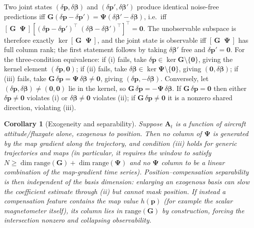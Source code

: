 \documentclass{IEEEtaes}
\newtheorem{corollary}{Corollary}
\begin{document}
\begin{IEEEproof}
Two joint states $(\delta\mathbf{p},\delta\boldsymbol{\beta})$ and
$(\delta\mathbf{p}',\delta\boldsymbol{\beta}')$ produce identical noise-free
predictions iff
$\mathbf{G}(\delta\mathbf{p}-\delta\mathbf{p}')=\boldsymbol{\Psi}(\delta\boldsymbol{\beta}'-\delta\boldsymbol{\beta})$,
i.e.\ iff
$[\,\mathbf{G}\;\;\boldsymbol{\Psi}\,]
[(\delta\mathbf{p}-\delta\mathbf{p}')^{\top}\;(\delta\boldsymbol{\beta}-\delta\boldsymbol{\beta}')^{\top}]^{\top}=\mathbf{0}$.
The unobservable subspace is therefore exactly
$\ker[\,\mathbf{G}\;\;\boldsymbol{\Psi}\,]$, and the joint state is observable iff
$[\,\mathbf{G}\;\;\boldsymbol{\Psi}\,]$ has full column rank; the first statement
follows by taking $\delta\boldsymbol{\beta}'$ free and $\delta\mathbf{p}'=\mathbf{0}$.
For the three-condition equivalence: if (i) fails, take
$\delta\mathbf{p}\in\ker\mathbf{G}\setminus\{\mathbf{0}\}$, giving the kernel
element $(\delta\mathbf{p},\mathbf{0})$; if (ii) fails, take
$\delta\boldsymbol{\beta}\in\ker\boldsymbol{\Psi}\setminus\{\mathbf{0}\}$, giving
$(\mathbf{0},\delta\boldsymbol{\beta})$; if (iii) fails, take
$\mathbf{G}\,\delta\mathbf{p}=\boldsymbol{\Psi}\,\delta\boldsymbol{\beta}\neq\mathbf{0}$,
giving $(\delta\mathbf{p},-\delta\boldsymbol{\beta})$. Conversely, let
$(\delta\mathbf{p},\delta\boldsymbol{\beta})\neq(\mathbf{0},\mathbf{0})$ lie in the
kernel, so $\mathbf{G}\,\delta\mathbf{p}=-\boldsymbol{\Psi}\,\delta\boldsymbol{\beta}$.
If $\mathbf{G}\,\delta\mathbf{p}=\mathbf{0}$ then either
$\delta\mathbf{p}\neq\mathbf{0}$ violates (i) or
$\delta\boldsymbol{\beta}\neq\mathbf{0}$ violates (ii); if
$\mathbf{G}\,\delta\mathbf{p}\neq\mathbf{0}$ it is a nonzero shared direction,
violating (iii).
\end{IEEEproof}

\begin{corollary}[Exogeneity and separability]\label{cor:exo}
Suppose $\mathbf{A}_t$ is a function of aircraft attitude/fluxgate
alone, exogenous to position. Then no column of $\boldsymbol{\Psi}$ is generated
by the map gradient along the trajectory, and condition (iii) holds for
generic trajectories and maps (in particular, it requires the window to satisfy
$N\ge\dim\mathrm{range}(\mathbf{G})+\dim\mathrm{range}(\boldsymbol{\Psi})$ and no
$\boldsymbol{\Psi}$ column to be a linear combination of the map-gradient time
series). Position--compensation separability is then independent of the
basis dimension: enlarging an exogenous basis can slow the coefficient estimate
through (ii) but cannot mask position. If instead a compensation feature
contains the map value $h(\mathbf{p})$ (for example the scalar magnetometer
itself), its column lies in $\mathrm{range}(\mathbf{G})$ by construction, forcing
the intersection nonzero and collapsing observability.
\end{corollary}
\end{document}
